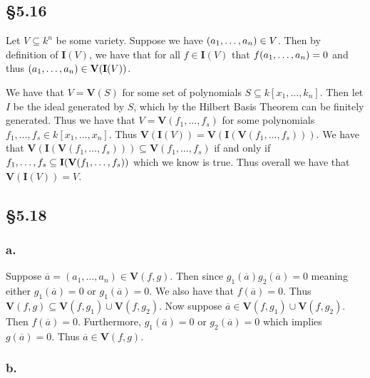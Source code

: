 \documentclass[letterpaper]{article}
\begin{document}
\clearpage

\subsection*{\S 5.16}

Let $V \subseteq k^{n}$ be some variety.
Suppose we have $\pqty{a_{1}, \ldots, a_{n}} \in V$.
Then by definition of $\mathbf{I}(V)$, we have that for all $f \in \mathbf{I}(V)$ that $f\pqty{a_{1}, \ldots, a_{n}} = 0$ and thus $\pqty{a_{1}, \ldots, a_{n}} \in \textbf{V}(\mathbf{I}(V))$.

We have that $V = \textbf{V}(S)$ for some set of polynomials $S \subseteq k[x_{1}, \ldots, k_{n}]$.
Then let $I$ be the ideal generated by $S$, which by the Hilbert Basis Theorem can be finitely generated.
Thus we have that $V = \textbf{V}(f_{1}, \ldots, f_{s})$ for some polynomials $f_{1}, \ldots, f_{s} \in k[x_{1}, \ldots, x_{n}]$.
Thus $\textbf{V}(\mathbf{I}(V)) = \textbf{V}(\mathbf{I}(\textbf{V}(f_{1}, \ldots, f_{s})))$.
We have that $\textbf{V}(\mathbf{I}(\textbf{V}(f_{1}, \ldots, f_{s}))) \subseteq \textbf{V}(f_{1}, \ldots, f_{s})$ if and only if $\gen{f_{1}, \ldots, f_{s}} \subseteq \mathbf{I}(\textbf{V}(f_{1}, \ldots, f_{s}))$ which we know is true.
Thus overall we have that $\textbf{V}(\mathbf{I}(V)) = V$.

\subsection*{\S 5.18}

\subsubsection*{a.}

Suppose $\overline{a} = (a_{1}, \ldots, a_{n}) \in \mathbf{V}(f, g)$.
Then since $g_{1}(\overline{a}) g_{2}(\overline{a}) = 0$ meaning either $g_{1}(\overline{a}) = 0$ or $g_{1}(\overline{a}) = 0$.
We also have that $f(\overline{a}) = 0$.
Thus $\mathbf{V}(f, g) \subseteq \mathbf{V}(f, g_{1}) \cup \mathbf{V}(f, g_{2})$.
Now suppose $\overline{a} \in \mathbf{V}(f, g_{1}) \cup \mathbf{V}(f, g_{2})$.
Then $f(\overline{a}) = 0$.
Furthermore, $g_{1}(\overline{a}) = 0$ or $g_{2}(\overline{a}) = 0$ which implies $g(\overline{a}) = 0$.
Thus $\overline{a} \in \mathbf{V}(f, g)$.

\subsubsection*{b.}
\end{document}
